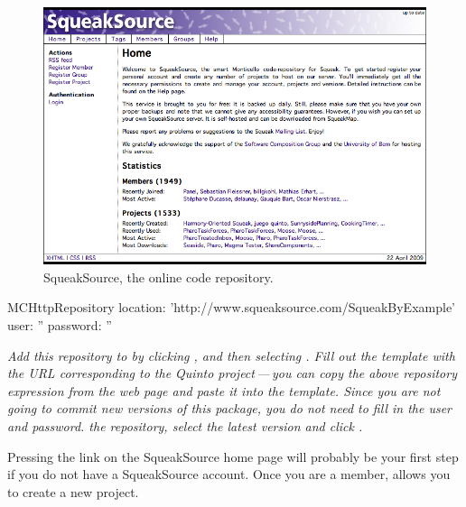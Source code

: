 \documentclass[a4paper,10pt,twoside]{book}
\begin{document}
\begin{figure}[ht]\centering
	\includegraphics[width=.75\textwidth]{squeaksource2}
	\caption{SqueakSource, the online \MC code repository.}
\end{figure}


\begin{code}{}
MCHttpRepository
    location: 'http://www.squeaksource.com/SqueakByExample'
    user: ''
    password: ''
\end{code}
\noindent
\emph{Add this repository to \MC by clicking , and then selecting . Fill out the template with the URL corresponding to the Quinto project\,---\,you can copy the above repository expression from the web page and paste it into the template.
Since you are not going to commit new versions of this package, you do not need to fill in the user and password.
 the repository, select the latest version and click .}

Pressing the  link on the SqueakSource home page will probably be your first step if you do not have a SqueakSource account. 
Once you are a member,  allows you to create a new project. 
\end{document}
